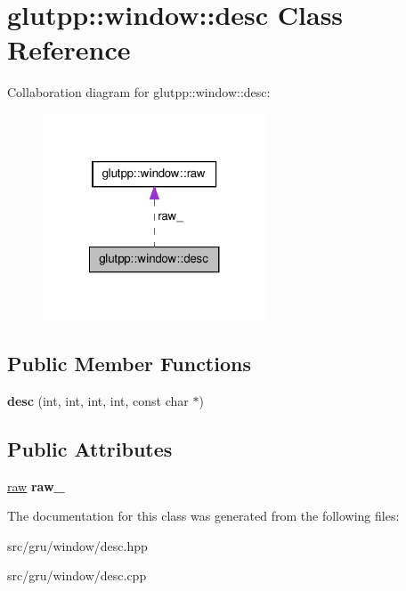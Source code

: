 \hypertarget{classglutpp_1_1window_1_1desc}{\section{glutpp\-:\-:window\-:\-:desc \-Class \-Reference}
\label{classglutpp_1_1window_1_1desc}
}


\-Collaboration diagram for glutpp\-:\-:window\-:\-:desc\-:
\nopagebreak
\begin{figure}[H]
\begin{center}
\leavevmode
\includegraphics[width=188pt]{classglutpp_1_1window_1_1desc__coll__graph}
\end{center}
\end{figure}
\subsection*{\-Public \-Member \-Functions}
\begin{DoxyCompactItemize}
\item 
\hypertarget{classglutpp_1_1window_1_1desc_ab63aad03d901472bc8fcaffce4dc84de}{{\bfseries desc} (int, int, int, int, const char $\ast$)}\label{classglutpp_1_1window_1_1desc_ab63aad03d901472bc8fcaffce4dc84de}

\end{DoxyCompactItemize}
\subsection*{\-Public \-Attributes}
\begin{DoxyCompactItemize}
\item 
\hypertarget{classglutpp_1_1window_1_1desc_ae879e3451cc166a1c28b164f88904698}{\hyperlink{structglutpp_1_1window_1_1raw}{raw} {\bfseries raw\-\_\-}}\label{classglutpp_1_1window_1_1desc_ae879e3451cc166a1c28b164f88904698}

\end{DoxyCompactItemize}


\-The documentation for this class was generated from the following files\-:\begin{DoxyCompactItemize}
\item 
src/gru/window/desc.\-hpp\item 
src/gru/window/desc.\-cpp\end{DoxyCompactItemize}
